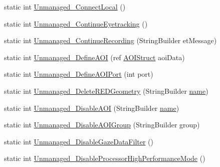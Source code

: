 \begin{DoxyCompactItemize}
\item 
static int \hyperlink{class_web_analyzer_1_1_eye_tracking_1_1_eye_tracking_controller_a7274ebe71919f5779c78fad75cc59a2d}{Unmanaged\+\_\+\+Connect\+Local} ()
\item 
static int \hyperlink{class_web_analyzer_1_1_eye_tracking_1_1_eye_tracking_controller_a0251ea3316cd40104672ca454c32fea0}{Unmanaged\+\_\+\+Continue\+Eyetracking} ()
\item 
static int \hyperlink{class_web_analyzer_1_1_eye_tracking_1_1_eye_tracking_controller_add43d368beb0432ce86435fb91f96a31}{Unmanaged\+\_\+\+Continue\+Recording} (String\+Builder et\+Message)
\item 
static int \hyperlink{class_web_analyzer_1_1_eye_tracking_1_1_eye_tracking_controller_af021545c0c0be1bdf70a24c665808663}{Unmanaged\+\_\+\+Define\+A\+O\+I} (ref \hyperlink{struct_web_analyzer_1_1_eye_tracking_1_1_eye_tracking_controller_1_1_a_o_i_struct}{A\+O\+I\+Struct} aoi\+Data)
\item 
static int \hyperlink{class_web_analyzer_1_1_eye_tracking_1_1_eye_tracking_controller_aa29d345faefa2b946ec2b86cec7908e9}{Unmanaged\+\_\+\+Define\+A\+O\+I\+Port} (int port)
\item 
static int \hyperlink{class_web_analyzer_1_1_eye_tracking_1_1_eye_tracking_controller_a07d549476da7b724800ba8f6f63f3419}{Unmanaged\+\_\+\+Delete\+R\+E\+D\+Geometry} (String\+Builder \hyperlink{_u_i_2_h_t_m_l_resources_2js_2src_2create__experiment_8js_adac2bcb4f01b574cbc63fe8ee2c56bf0}{name})
\item 
static int \hyperlink{class_web_analyzer_1_1_eye_tracking_1_1_eye_tracking_controller_a0f6b4f0997a45dc6e37f8f9bfdc1b233}{Unmanaged\+\_\+\+Disable\+A\+O\+I} (String\+Builder \hyperlink{_u_i_2_h_t_m_l_resources_2js_2src_2create__experiment_8js_adac2bcb4f01b574cbc63fe8ee2c56bf0}{name})
\item 
static int \hyperlink{class_web_analyzer_1_1_eye_tracking_1_1_eye_tracking_controller_ac4c016df4e409004e540f2192da67bcf}{Unmanaged\+\_\+\+Disable\+A\+O\+I\+Group} (String\+Builder group)
\item 
static int \hyperlink{class_web_analyzer_1_1_eye_tracking_1_1_eye_tracking_controller_af56e0b8198a8cd79d950dc5fd9b7769c}{Unmanaged\+\_\+\+Disable\+Gaze\+Data\+Filter} ()
\item 
static int \hyperlink{class_web_analyzer_1_1_eye_tracking_1_1_eye_tracking_controller_a976bb83b29a5f8462ee86d51bd4de730}{Unmanaged\+\_\+\+Disable\+Processor\+High\+Performance\+Mode} ()
\item 

\end{DoxyCompactItemize}
